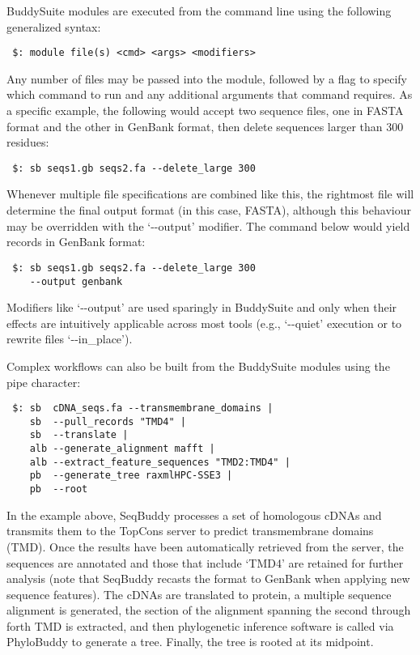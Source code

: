 \documentclass[nogrid]{MBE_article}%
\begin{document}
BuddySuite modules are executed from the command line using the following generalized syntax:

\smallskip

{\small
\begin{verbatim}
 $: module file(s) <cmd> <args> <modifiers>
\end{verbatim}
}
\smallskip

Any number of files may be passed into the module, followed by a flag to specify which command to run and any additional arguments that command requires. As a specific example, the following would accept two sequence files, one in FASTA format and the other in GenBank format, then delete sequences larger than 300 residues:

\smallskip

{\small
\begin{verbatim}
 $: sb seqs1.gb seqs2.fa --delete_large 300
\end{verbatim}
}
\smallskip

Whenever multiple file specifications are combined like this, the rightmost file will determine the final output format (in this case, FASTA), although this behaviour may be overridden with the `-{}-output' modifier. The command below would yield records in GenBank format:

\smallskip

{\small
\begin{verbatim}
 $: sb seqs1.gb seqs2.fa --delete_large 300
    --output genbank
\end{verbatim}
}
\smallskip

Modifiers like \mbox{`-{}-output'} are used sparingly in BuddySuite and only when their effects are intuitively applicable across most tools (e.g., \mbox{`-{}-quiet'} execution or to rewrite files \mbox{`-{}-in\_place'}).

Complex workflows can also be built from the BuddySuite modules using the pipe character:

\smallskip
{\small
\begin{verbatim}
 $: sb  cDNA_seqs.fa --transmembrane_domains |
    sb  --pull_records "TMD4" |
    sb  --translate |
    alb --generate_alignment mafft |
    alb --extract_feature_sequences "TMD2:TMD4" |
    pb  --generate_tree raxmlHPC-SSE3 |
    pb  --root
\end{verbatim}
}

\smallskip

In the example above, SeqBuddy processes a set of homologous cDNAs and transmits them to the TopCons server \cite{Tsirigos:2015eo} to predict transmembrane domains (TMD). Once the results have been automatically retrieved from the server, the sequences are annotated and those that include `TMD4' are retained for further analysis (note that SeqBuddy recasts the format to GenBank when applying new sequence features). The cDNAs are translated to protein, a multiple sequence alignment is generated, the section of the alignment spanning the second through forth TMD is extracted, and then phylogenetic inference software is called via PhyloBuddy to generate a tree. Finally, the tree is rooted at its midpoint.
\end{document}
